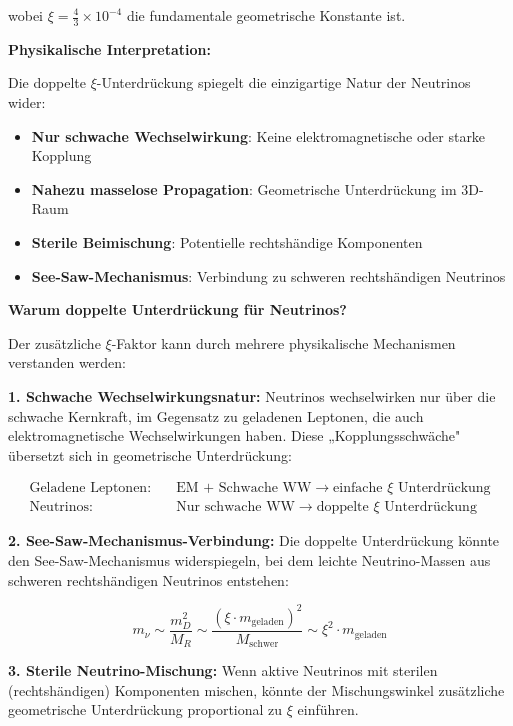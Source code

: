 \documentclass[12pt,a4paper]{article}
\begin{document}
	wobei $\xi = \frac{4}{3} \times 10^{-4}$ die fundamentale geometrische Konstante ist.
	
	\textbf{Physikalische Interpretation:}
	
	Die doppelte $\xi$-Unterdrückung spiegelt die einzigartige Natur der Neutrinos wider:
	\begin{itemize}
		\item \textbf{Nur schwache Wechselwirkung}: Keine elektromagnetische oder starke Kopplung
		\item \textbf{Nahezu masselose Propagation}: Geometrische Unterdrückung im 3D-Raum
		\item \textbf{Sterile Beimischung}: Potentielle rechtshändige Komponenten
		\item \textbf{See-Saw-Mechanismus}: Verbindung zu schweren rechtshändigen Neutrinos
	\end{itemize}
	
	\textbf{Warum doppelte Unterdrückung für Neutrinos?}
	
	Der zusätzliche $\xi$-Faktor kann durch mehrere physikalische Mechanismen verstanden werden:
	
	\textbf{1. Schwache Wechselwirkungsnatur:}
	Neutrinos wechselwirken nur über die schwache Kernkraft, im Gegensatz zu geladenen Leptonen, die auch elektromagnetische Wechselwirkungen haben. Diese „Kopplungsschwäche" übersetzt sich in geometrische Unterdrückung:
	
	\begin{align}
		\text{Geladene Leptonen:} \quad &\text{EM + Schwache WW} \rightarrow \text{einfache } \xi \text{ Unterdrückung} \\
		\text{Neutrinos:} \quad &\text{Nur schwache WW} \rightarrow \text{doppelte } \xi \text{ Unterdrückung}
	\end{align}
	
	\textbf{2. See-Saw-Mechanismus-Verbindung:}
	Die doppelte Unterdrückung könnte den See-Saw-Mechanismus widerspiegeln, bei dem leichte Neutrino-Massen aus schweren rechtshändigen Neutrinos entstehen:
	
	\begin{equation}
		m_{\nu} \sim \frac{m_D^2}{M_R} \sim \frac{(\xi \cdot m_\text{geladen})^2}{M_\text{schwer}} \sim \xi^2 \cdot m_\text{geladen}
	\end{equation}
	
	\textbf{3. Sterile Neutrino-Mischung:}
	Wenn aktive Neutrinos mit sterilen (rechtshändigen) Komponenten mischen, könnte der Mischungswinkel zusätzliche geometrische Unterdrückung proportional zu $\xi$ einführen.
	
\end{document}
